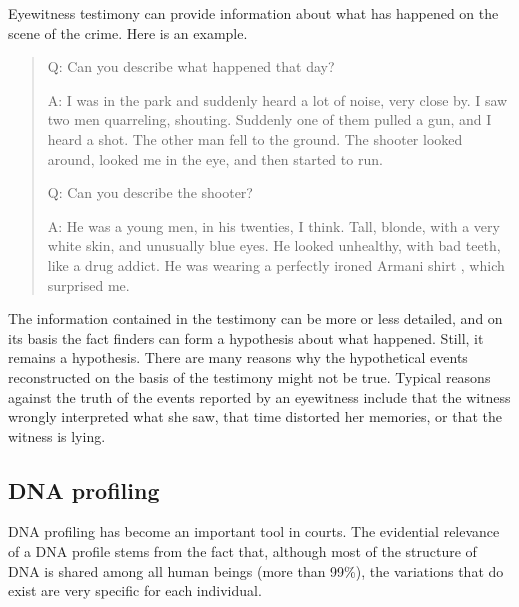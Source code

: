 \documentclass[10pt]{article}
\begin{document}
Eyewitness testimony can provide information about what 
has happened on the scene of the crime. Here is an example.
%
\begin{quote}
Q: Can you describe what happened that day?

A: I was in the park and suddenly heard a lot of noise, very close by. I saw two men quarreling, shouting. Suddenly one of them pulled a gun, 
and I heard a shot. The other man fell to the ground. The shooter looked around, looked me in the eye, and then started to run.

Q: Can you describe the shooter?

A: He was a young men, in his twenties, I think. Tall, blonde, with a very white skin, and unusually blue eyes. 
He looked unhealthy, with bad teeth, 
like a drug addict. He was wearing a perfectly ironed Armani shirt%
, which surprised me. %
\end{quote}
%
The information contained in the testimony can be 
more or less detailed, and on its basis the fact finders
can form a hypothesis about what happened. 
Still, it remains a hypothesis. There are many reasons why the hypothetical events reconstructed on the basis of the testimony might not be true. Typical reasons against the truth of the events reported by an eyewitness include that the witness wrongly interpreted what she saw, that time distorted her memories, or that the witness is lying. 

\subsection{DNA profiling}

DNA profiling has become an important tool in courts. The evidential relevance of a DNA profile stems from the fact that, although most of the structure of DNA is shared among all human beings (more than 99\%), the variations that do exist are very specific for each individual. %
\end{document}
